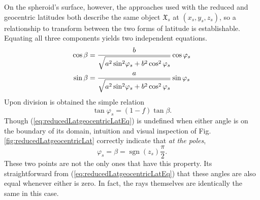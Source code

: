 \documentclass[11pt,dvipsnames]{thesis}
\begin{document}
On the spheroid's surface, however, the approaches used with the reduced and geocentric latitudes both describe the same object $\mathfrak{X}_s$ at $(x_s, y_s, z_s)$, so a relationship to transform between the two forms of latitude is establishable. Equating all three components yields two independent equations.
\begin{align}
\cos\beta &= \frac{b}{\sqrt{\vphantom{\cosphantom^2} a^2 \,\smash{\sin}^2\varphi_s + b^2\cos^2\varphi_s}} \cos\varphi_s \\
\sin\beta &= \frac{a}{\sqrt{\vphantom{\cosphantom^2} a^2 \,\smash{\sin}^2\varphi_s + b^2\cos^2\varphi_s}} \sin\varphi_s
\end{align}
Upon division is obtained the simple relation
\begin{equation}
\tan\varphi_s = (1 - f) \tan\beta. \label{eq:reducedLatgeocentricLatEq}
\end{equation}
Though (\ref{eq:reducedLatgeocentricLatEq}) is undefined when either angle is on the boundary of its domain, intuition and visual inspection of Fig. \ref{fig:reducedLatgeocentricLat} correctly indicate that \textit{at the poles},
\begin{equation}
\varphi_s = \beta = \operatorname{sgn}(z_s) \frac{\pi}{2}.
\end{equation}
These two points are not the only ones that have this property. Its straightforward from (\ref{eq:reducedLatgeocentricLatEq}) that these angles are also equal whenever either is zero. In fact, the rays themselves are identically the same in this case.
\end{document}
